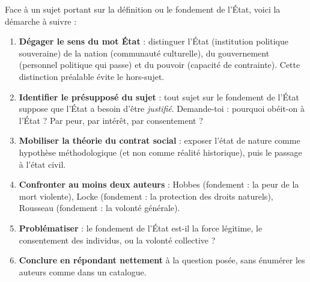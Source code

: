 \documentclass[11pt]{article}
\newcommand{\cle}[1]{{\popxbold\color{popdark}#1}}
\begin{document}
\begin{methode}
Face à un sujet portant sur la définition ou le fondement de l'État, voici la démarche à suivre :
\begin{enumerate}
\item \textbf{Dégager le sens du mot \cle{État}} : distinguer l'\cle{État} (institution politique souveraine) de la \cle{nation} (communauté culturelle), du \cle{gouvernement} (personnel politique qui passe) et du \cle{pouvoir} (capacité de contrainte). Cette distinction préalable évite le hors-sujet.
\item \textbf{Identifier le présupposé du sujet} : tout sujet sur le fondement de l'État suppose que l'État a besoin d'être \emph{justifié}. Demande-toi : pourquoi obéit-on à l'État ? Par peur, par intérêt, par \cle{consentement} ?
\item \textbf{Mobiliser la théorie du \cle{contrat social}} : exposer l'\cle{état de nature} comme hypothèse méthodologique (et non comme réalité historique), puis le passage à l'état civil.
\item \textbf{Confronter au moins deux auteurs} : Hobbes (fondement : la peur de la mort violente), Locke (fondement : la protection des \cle{droits naturels}), Rousseau (fondement : la \cle{volonté générale}).
\item \textbf{Problématiser} : le fondement de l'État est-il la force légitime, le consentement des individus, ou la volonté collective ?
\item \textbf{Conclure en répondant nettement} à la question posée, sans énumérer les auteurs comme dans un catalogue.
\end{enumerate}
\end{methode}
\end{document}
